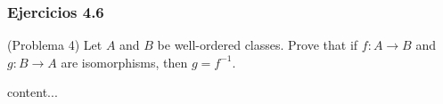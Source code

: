\subsubsection{Ejercicios 4.6}
\begin{problema}(Problema 4)
	Let $A$ and $B$ be well-ordered classes. Prove that if $f: A \rightarrow B$ and $g: B \rightarrow A$ are isomorphisms, then $g=f^{-1}$.
	\begin{dem}
		content...
	\end{dem}
\end{problema}



	




